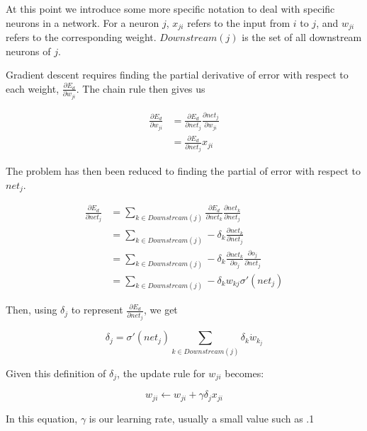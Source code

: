 \documentclass[a4paper, 11pt]{article} %
\begin{document}
At this point we introduce some more specific notation to deal with specific neurons in a network.  For a neuron $j$, $x_{ji}$ refers to the input from $i$ to $j$, and $w_{ji}$ refers to the corresponding weight.  $Downstream(j)$ is the set of all downstream neurons of $j$.

Gradient descent requires finding the partial derivative of error with respect to each weight, $\frac{\partial E_d}{\partial w_{ji}}$.  The chain rule then gives us

\begin{equation}
\begin{split}
\frac{\partial E_d}{\partial w_{ji}} & = \frac{\partial E_d}{\partial net_j} \frac{\partial net_j}{\partial w_{ji}} \\
& = \frac{\partial E_d}{\partial net_j} x_{ji}
\end{split}
\end{equation}

The problem has then been reduced to finding the partial of error with respect to $net_j$.

\begin{equation}
\begin{split}
\frac{\partial E_d}{\partial net_j} & = \sum_{k \in Downstream(j)} \frac{\partial E_d}{\partial net_k} \frac{\partial net_k}{\partial net_j} \\
& = \sum_{k \in Downstream(j)} -\delta_k \frac{\partial net_k}{\partial net_j} \\
& = \sum_{k \in Downstream(j)} -\delta_k \frac{\partial net_k}{\partial o_j} \frac{\partial o_j}{\partial net_j} \\
& = \sum_{k \in Downstream(j)} -\delta_k w_{kj} \sigma '(net_j)
\end{split}
\end{equation}

Then, using $\delta_j$ to represent $\frac{\partial E_d}{\partial net_j}$, we get

\begin{equation}
\delta_j = \sigma '(net_j) \sum_{k \in Downstream(j)} \delta_k \dot w_{k_j}
\end{equation}

Given this definition of $\delta_j$, the update rule for $w_{ji}$ becomes:

\begin{equation}
w_{ji} \leftarrow w_{ji} + \gamma \delta_j x_{ji}
\end{equation}

In this equation, $\gamma$ is our learning rate, usually a small value such as .1
\end{document}

